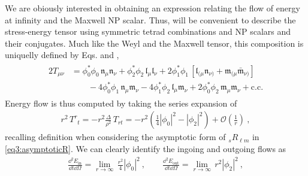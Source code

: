 We are obiously interested in obtaining an expression relating the flow of energy at infinity and the Maxwell NP scalar. Thus, will be convenient to describe the stress-energy tensor using symmetric tetrad combinations and NP scalars and their conjugates. Much like the Weyl and the Maxwell tensor, this composition is uniquelly defined by Eqs.  and ,
\begin{align}
    \begin{split}
    2 T_{\mu\nu} &= \phi_0^* \phi_0 \, \mathfrak{n}_\mu \mathfrak{n}_\nu + \phi_2^* \phi_2 \, \mathfrak{l}_\mu \mathfrak{l}_\nu + 2 \phi_1^* \phi_1 \, [ \mathfrak{l}_{(\mu} \mathfrak{n}_{\nu)} + \mathfrak{m}_{(\mu} \bar{\mathfrak{m}}_{\nu)} ] \\
    &\qquad - 4 \phi_0^* \phi_1 \, \mathfrak{n}_\mu \mathfrak{m}_\nu - 4 \phi_1^* \phi_2 \, \mathfrak{l}_\mu \mathfrak{m}_\nu + 2 \phi_0^* \phi_2 \, \mathfrak{m}_\mu \mathfrak{m}_\nu + \text{c.c.}
    \end{split}
    \label{eq3:stressEnergyPhi}
\end{align}
Energy flow is thus computed by taking the series expansion of
\begin{align}
    r^2 \,T^{r}{}_t = - r^2 \frac{\Delta}{\rho^2} \,T_{rt} = - r^2 \left(\frac{1}{4} |\phi_0|^2 - |\phi_2|^2\right) + \mathscr{O}\left(\frac{1}{r}\right) ~,
\end{align}
recalling definition  when considering the asymptotic form of ${}_{s}R_{\ell m}$ in \eqref{eq3:asymptoticR}.
We can clearly identify the ingoing and outgoing flows as
\begin{align}
    \frac{\dd^2 E_\mathrm{in}}{\dd t \dd\Omega} = \lim_{r\to\infty} \,\frac{r^2}{4} |\phi_0|^2 ~,\qquad \frac{\dd^2 E_\mathrm{out}}{\dd t \dd\Omega} = \lim_{r\to\infty} \, r^2 |\phi_2|^2 ~,
\end{align}

